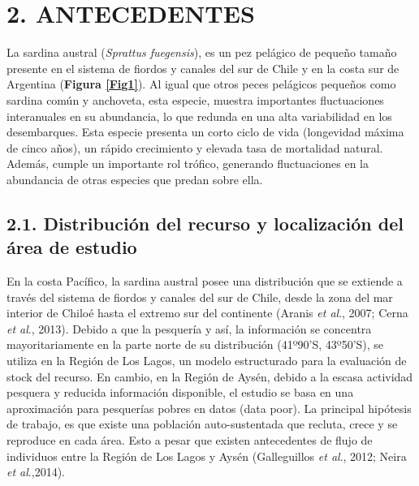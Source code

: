 \documentclass[
  spanish,
]{article}
\begin{document}
\pagebreak
\normalsize

\hypertarget{antecedentes}{%
\section{2. ANTECEDENTES}\label{antecedentes}}

La sardina austral (\emph{Sprattus fuegensis}), es un pez pelágico de
pequeño tamaño presente en el sistema de fiordos y canales del sur de
Chile y en la costa sur de Argentina (\textbf{Figura \ref{Fig1}}). Al
igual que otros peces pelágicos pequeños como sardina común y anchoveta,
esta especie, muestra importantes fluctuaciones interanuales en su
abundancia, lo que redunda en una alta variabilidad en los desembarques.
Esta especie presenta un corto ciclo de vida (longevidad máxima de cinco
años), un rápido crecimiento y elevada tasa de mortalidad natural.
Además, cumple un importante rol trófico, generando fluctuaciones en la
abundancia de otras especies que predan sobre ella.

\hypertarget{distribuciuxf3n-del-recurso-y-localizaciuxf3n-del-uxe1rea-de-estudio}{%
\subsection{2.1. Distribución del recurso y localización del área de
estudio}\label{distribuciuxf3n-del-recurso-y-localizaciuxf3n-del-uxe1rea-de-estudio}}

En la costa Pacífico, la sardina austral posee una distribución que se
extiende a través del sistema de fiordos y canales del sur de Chile,
desde la zona del mar interior de Chiloé hasta el extremo sur del
continente (Aranis \emph{et al}., 2007; Cerna \emph{et al}., 2013).
Debido a que la pesquería y así, la información se concentra
mayoritariamente en la parte norte de su distribución (41º90'S,
43º50'S), se utiliza en la Región de Los Lagos, un modelo estructurado
para la evaluación de stock del recurso. En cambio, en la Región de
Aysén, debido a la escasa actividad pesquera y reducida información
disponible, el estudio se basa en una aproximación para pesquerías
pobres en datos (data poor). La principal hipótesis de trabajo, es que
existe una población auto-sustentada que recluta, crece y se reproduce
en cada área. Esto a pesar que existen antecedentes de flujo de
individuos entre la Región de Los Lagos y Aysén (Galleguillos \emph{et
al}., 2012; Neira \emph{et al}.,2014).

\vspace{0.8cm}
\end{document}
